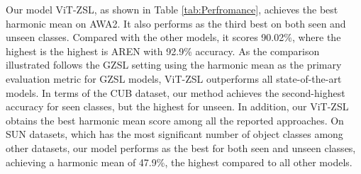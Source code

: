 \documentclass[a4paper,11pt]{article}
\newcommand{\anjan}[1]{\textcolor{red}{Anjan: #1}}
\begin{document}
\begin{comment}

\begin{wrapfigure}{r}{\textwidth} 
  \vspace{-20pt}
  \begin{center}
    \centering
\subfigure{
\texttt{[image: images/1.1.jpg]}  
\texttt{[image: images/1.3.jpg]}
\texttt{[image: images/1.2.jpg]}
}
\subfigure{
\texttt{[image: images/2.1.jpg]}  
\texttt{[image: images/2.3.jpg]}
\texttt{[image: images/2.2.jpg]}
}
\subfigure{
\texttt{[image: images/3.1.jpg]}  
\texttt{[image: images/3.3\_U.jpg]}
\texttt{[image: images/3.2.jpg]}
}

\end{center}
\vspace{-20pt}
  \caption{Representative examples of attention. Left: Original images, Middle: Attention maps, and Right: Attention fusions}
  \label{Att_Figure}
\end{wrapfigure}
\end{comment}


Our model ViT-ZSL, as shown in Table \ref{tab:Perfromance}, {achieves the best harmonic mean on AWA2. It also performs as the third best on both seen and unseen classes}. Compared with the other models, {it scores 90.02\%, where the highest is the highest is AREN with 92.9\% accuracy. As the comparison illustrated follows the GZSL setting using the harmonic mean as the primary evaluation metric for GZSL models, ViT-ZSL outperforms all state-of-the-art models.}
In terms of the CUB dataset, our method {achieves the second-highest accuracy for seen classes, but
the highest for unseen}. In addition, our ViT-ZSL {obtains the best harmonic mean score among all the reported approaches}. On SUN datasets, which has the most significant number of object classes among other datasets, our model performs as the best for both seen and unseen classes, achieving a harmonic mean of 47.9\%, the highest compared to all other models. 
\end{document}
